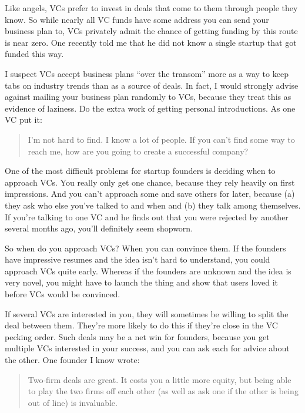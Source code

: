 \documentclass[12pt]{book}
\begin{document}
Like angels, VCs prefer to invest in deals that come to them through
people they know. So while nearly all VC funds have some address you can
send your business plan to, VCs privately admit the chance of getting
funding by this route is near zero. One recently told me that he did not
know a single startup that got funded this way.

I suspect VCs accept business plans ``over the transom'' more as a way
to keep tabs on industry trends than as a source of deals. In fact, I
would strongly advise against mailing your business plan randomly to
VCs, because they treat this as evidence of laziness. Do the extra work
of getting personal introductions. As one VC put it:

\begin{quote}
I'm not hard to find. I know a lot of people. If you can't find some way
to reach me, how are you going to create a successful company?
\end{quote}

One of the most difficult problems for startup founders is deciding when
to approach VCs. You really only get one chance, because they rely
heavily on first impressions. And you can't approach some and save
others for later, because (a) they ask who else you've talked to and
when and (b) they talk among themselves. If you're talking to one VC and
he finds out that you were rejected by another several months ago,
you'll definitely seem shopworn.

So when do you approach VCs? When you can convince them. If the founders
have impressive resumes and the idea isn't hard to understand, you could
approach VCs quite early. Whereas if the founders are unknown and the
idea is very novel, you might have to launch the thing and show that
users loved it before VCs would be convinced.

If several VCs are interested in you, they will sometimes be willing to
split the deal between them. They're more likely to do this if they're
close in the VC pecking order. Such deals may be a net win for founders,
because you get multiple VCs interested in your success, and you can ask
each for advice about the other. One founder I know wrote:

\begin{quote}
Two-firm deals are great. It costs you a little more equity, but being
able to play the two firms off each other (as well as ask one if the
other is being out of line) is invaluable.
\end{quote}
\end{document}
